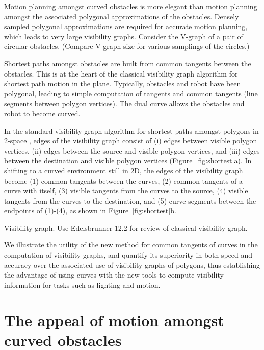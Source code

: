 \documentclass[11pt,twocolumn]{article}
\begin{document}
Motion planning amongst curved obstacles is more elegant
than motion planning amongst the associated polygonal approximations
of the obstacles.
Densely sampled polygonal approximations are required for accurate motion
planning, which leads to very large visibility graphs.
Consider the V-graph of a pair of circular obstacles.
(Compare V-graph size for various samplings of the circles.)



Shortest paths amongst obstacles are built from common tangents
between the obstacles.
This is at the heart of the classical visibility graph algorithm for 
shortest path motion in the plane.
Typically, obstacles and robot have been polygonal, leading to simple
computation of tangents and common tangents (line segments between polygon
vertices).
The dual curve allows the obstacles and robot to become curved.

In the standard visibility 
graph algorithm for shortest paths amongst polygons in 2-space \cite{lozano79},
edges of the visibility graph consist of (i) edges between visible polygon vertices,
(ii) edges between the source and visible polygon vertices,
and (iii) edges between the destination and visible polygon vertices 
(Figure~\ref{fig:shortest}a).
In shifting to a curved environment still in 2D,
the edges of the visibility graph become (1) common tangents between the curves,
(2) common tangents of a curve with itself, 
(3) visible tangents from the curves to the source, 
(4) visible tangents from the curves to the destination,
and (5) curve segments between the endpoints of (1)-(4), as shown in
Figure~\ref{fig:shortest}b.

\begin{defn2}
Visibility graph. Use Edelsbrunner 12.2 for review of classical visibility graph.
\end{defn2}

We illustrate the utility of the new method for common tangents of curves in the
computation of visibility graphs,
and quantify its superiority in both speed and accuracy 
over the associated use of visibility graphs of polygons,
thus establishing the advantage of using curves with the new tools to compute
visibility information for tasks such as lighting and motion.


\section{The appeal of motion amongst curved obstacles}
\end{document}
